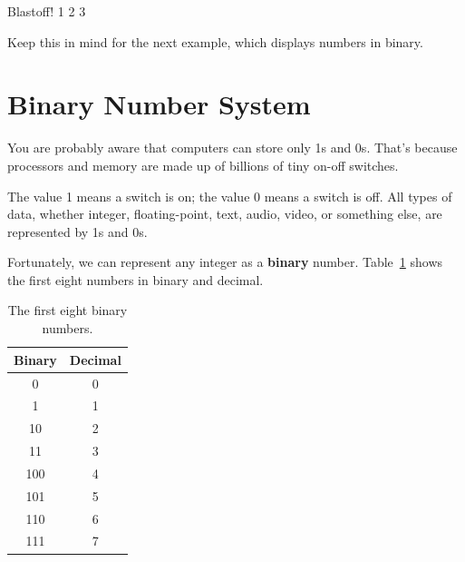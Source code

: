 \begin{stdout}
Blastoff!
1
2
3
\end{stdout}

Keep this in mind for the next example, which displays numbers in binary.

\section{Binary Number System}
\label{binary}

You are probably aware that computers can store only 1s and 0s.
That's because processors and memory are made up of billions of tiny on-off switches.

The value 1 means a switch is on; the value 0 means a switch is off.
All types of data, whether integer, floating-point, text, audio, video, or something else, are represented by 1s and 0s.


Fortunately, we can represent any integer as a {\bf binary} number.
Table~\ref{tab:binary} shows the first eight numbers in binary and decimal.

\begin{table}[!ht]
\begin{center}
\begin{tabular}{|c|c|}
\hline
Binary & Decimal \\
\hline
0 & 0 \\
\hline
1 & 1 \\
\hline
10 & 2 \\
\hline
11 & 3 \\
\hline
100 & 4 \\
\hline
101 & 5 \\
\hline
110 & 6 \\
\hline
111 & 7 \\
\hline
\end{tabular}
\caption{The first eight binary numbers.}
\label{tab:binary}
\end{center}
\end{table}



